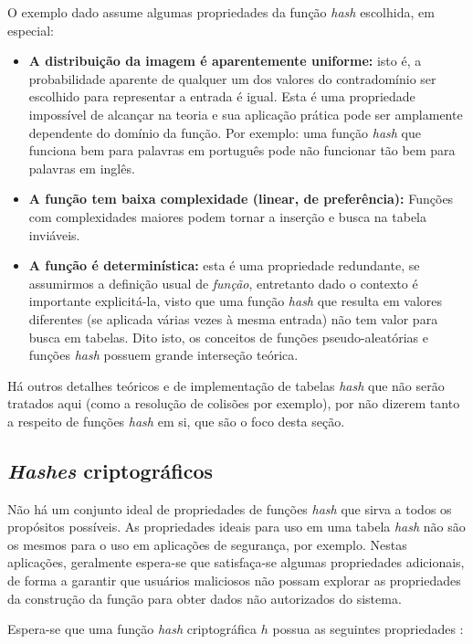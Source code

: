 O exemplo dado assume algumas propriedades da função \emph{hash} escolhida, em especial:
\begin{itemize}
  \item \textbf{A distribuição da imagem é aparentemente uniforme:} isto é, a probabilidade aparente de qualquer um dos valores do contradomínio ser escolhido para representar a entrada é igual. Esta é uma propriedade impossível de alcançar na teoria e sua aplicação prática pode ser amplamente dependente do domínio da função. Por exemplo: uma função \emph{hash} que funciona bem para palavras em português pode não funcionar tão bem para palavras em inglês.
  
  \item \textbf{A função tem baixa complexidade (linear, de preferência):} Funções com complexidades maiores podem tornar a inserção e busca na tabela inviáveis.
  
  \item \textbf{A função é determinística:} esta é uma propriedade redundante, se assumirmos a definição usual de \emph{função}, entretanto dado o contexto é importante explicitá-la, visto que uma função \emph{hash} que resulta em valores diferentes (se aplicada várias vezes à mesma entrada) não tem valor para busca em tabelas. Dito isto, os conceitos de funções pseudo-aleatórias e funções \emph{hash} possuem grande interseção teórica.
\end{itemize}

Há outros detalhes teóricos e de implementação de tabelas \emph{hash} que não serão tratados aqui (como a resolução de colisões por exemplo), por não dizerem tanto a respeito de funções \emph{hash} em si, que são o foco desta seção.

\subsection{\emph{Hashes} criptográficos}\label{sec:hashcripto}

Não há um conjunto ideal de propriedades de funções \emph{hash} que sirva a todos os propósitos possíveis. As propriedades ideais para uso em uma tabela \emph{hash} não são os mesmos para o uso em aplicações de segurança, por exemplo. Nestas aplicações, geralmente espera-se que satisfaça-se algumas propriedades adicionais, de forma a garantir que usuários maliciosos não possam explorar as propriedades da construção da função para obter dados não autorizados do sistema.

Espera-se que uma função \emph{hash} criptográfica $h$ possua as seguintes propriedades \cite{katz2014introduction}:


